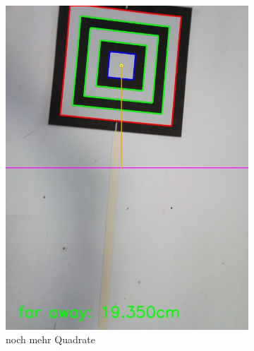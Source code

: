 \begin{figure}
\begin{subfigure}{0.3\textwidth}
        \includegraphics[width=0.95\linewidth]{pics/zielfeld/04.jpg}
        \caption{noch mehr Quadrate}
        \label{fig:zielfeld4}
    \end{subfigure}
    \begin{subfigure}{0.3\textwidth}
        \centering

\end{subfigure}
\end{figure}
